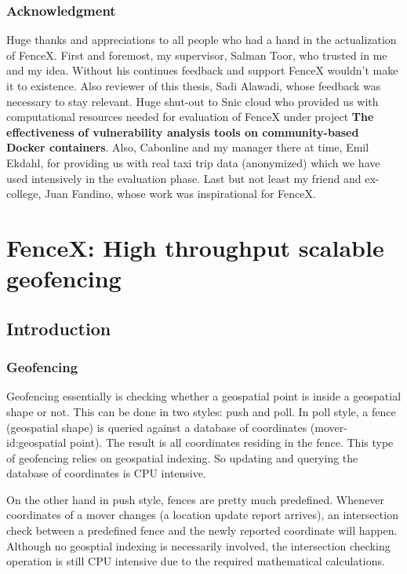 \documentclass[a4]{report}
\begin{document}
        \section{Acknowledgment}
        Huge thanks and appreciations to all people who had a hand in the actualization of FenceX.
        First and foremost, my supervisor, Salman Toor, who trusted in me and my idea.
        Without his continues feedback and support FenceX wouldn't make it to existence.
        Also reviewer of this thesis, Sadi Alawadi, whose feedback was necessary to stay relevant.
        Huge shut-out to Snic cloud who provided us with computational resources needed for evaluation of FenceX under
        project \textbf{The effectiveness of vulnerability analysis tools on community-based Docker containers}.
        Also, Cabonline and my manager there at time,  Emil Ekdahl, for providing us with real taxi trip data
        (anonymized) which we have used intensively in the evaluation phase.
        Last but not least my friend and ex-college, Juan Fandino, whose work was inspirational for FenceX.

        \part[FenceX]{FenceX: High throughput scalable geofencing}

        \chapter{Introduction}

        \section{Geofencing}
        Geofencing essentially is checking whether a geospatial point is inside a geospatial shape or not.
        This can be done in two styles: push and poll.
        In poll style, a fence (geospatial shape) is queried against a database of coordinates (mover-id:geospatial point).
        The result is all coordinates residing in the fence.
        This type of geofencing relies on geospatial indexing.
        So updating and querying the database of coordinates is CPU intensive.

        On the other hand in push style, fences are pretty much predefined.
        Whenever coordinates of a mover changes (a location update report arrives), an intersection check between a
        predefined fence and the newly reported coordinate will happen.
        Although no geosptial indexing is necessarily involved, the intersection checking operation is still CPU
        intensive due to the required mathematical calculations.
\end{document}
